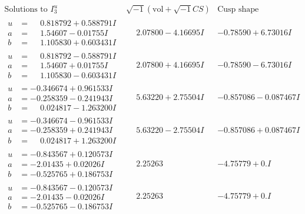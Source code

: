 \documentclass[1p]{elsarticle_modified}
\theoremstyle{definition}
\newcommand{\I}{\sqrt{-1}}
\begin{document}
$$\begin{array}{c|c|c}  
\text{Solutions to }I^u_{3}& \I (\text{vol} + \sqrt{-1}CS) & \text{Cusp shape}\\
 \hline 
\begin{aligned}
u &= \phantom{-}0.818792 + 0.588791 I \\
a &= \phantom{-}1.54607 - 0.01755 I \\
b &= \phantom{-}1.105830 + 0.603431 I\end{aligned}
 & \phantom{-}2.07800 - 4.16695 I & -0.78590 + 6.73016 I \\ \hline\begin{aligned}
u &= \phantom{-}0.818792 - 0.588791 I \\
a &= \phantom{-}1.54607 + 0.01755 I \\
b &= \phantom{-}1.105830 - 0.603431 I\end{aligned}
 & \phantom{-}2.07800 + 4.16695 I & -0.78590 - 6.73016 I \\ \hline\begin{aligned}
u &= -0.346674 + 0.961533 I \\
a &= -0.258359 - 0.241943 I \\
b &= \phantom{-}0.024817 - 1.263200 I\end{aligned}
 & \phantom{-}5.63220 + 2.75504 I & -0.857086 - 0.087467 I \\ \hline\begin{aligned}
u &= -0.346674 - 0.961533 I \\
a &= -0.258359 + 0.241943 I \\
b &= \phantom{-}0.024817 + 1.263200 I\end{aligned}
 & \phantom{-}5.63220 - 2.75504 I & -0.857086 + 0.087467 I \\ \hline\begin{aligned}
u &= -0.843567 + 0.120573 I \\
a &= -2.01435 + 0.02026 I \\
b &= -0.525765 + 0.186753 I\end{aligned}
 & \phantom{-}2.25263\phantom{ +0.000000I} & -4.75779 + 0. I\phantom{ +0.000000I} \\ \hline\begin{aligned}
u &= -0.843567 - 0.120573 I \\
a &= -2.01435 - 0.02026 I \\
b &= -0.525765 - 0.186753 I\end{aligned}
 & \phantom{-}2.25263\phantom{ +0.000000I} & -4.75779 + 0. I\phantom{ +0.000000I} \\ \hline\begin{aligned}

\end{aligned}
\end{array}$$
\end{document}
